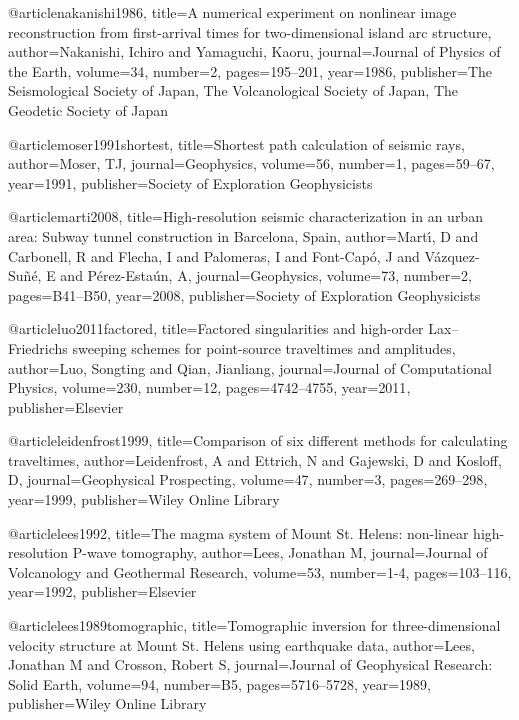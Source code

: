 @article{nakanishi1986,
  title={A numerical experiment on nonlinear image reconstruction from first-arrival times for two-dimensional island arc structure},
  author={Nakanishi, Ichiro and Yamaguchi, Kaoru},
  journal={Journal of Physics of the Earth},
  volume={34},
  number={2},
  pages={195--201},
  year={1986},
  publisher={The Seismological Society of Japan, The Volcanological Society of Japan, The Geodetic Society of Japan}
}

@article{moser1991shortest,
  title={Shortest path calculation of seismic rays},
  author={Moser, TJ},
  journal={Geophysics},
  volume={56},
  number={1},
  pages={59--67},
  year={1991},
  publisher={Society of Exploration Geophysicists}
}



@article{marti2008,
  title={High-resolution seismic characterization in an urban area: Subway tunnel construction in Barcelona, Spain},
  author={Mart{\'\i}, D and Carbonell, R and Flecha, I and Palomeras, I and Font-Cap{\'o}, J and V{\'a}zquez-Su{\~n}{\'e}, E and P{\'e}rez-Esta{\'u}n, A},
  journal={Geophysics},
  volume={73},
  number={2},
  pages={B41--B50},
  year={2008},
  publisher={Society of Exploration Geophysicists}
}

@article{luo2011factored,
  title={Factored singularities and high-order Lax--Friedrichs sweeping schemes for point-source traveltimes and amplitudes},
  author={Luo, Songting and Qian, Jianliang},
  journal={Journal of Computational Physics},
  volume={230},
  number={12},
  pages={4742--4755},
  year={2011},
  publisher={Elsevier}
}



@article{leidenfrost1999,
  title={Comparison of six different methods for calculating traveltimes},
  author={Leidenfrost, A and Ettrich, N and Gajewski, D and Kosloff, D},
  journal={Geophysical Prospecting},
  volume={47},
  number={3},
  pages={269--298},
  year={1999},
  publisher={Wiley Online Library}
}


@article{lees1992,
  title={The magma system of Mount St. Helens: non-linear high-resolution P-wave tomography},
  author={Lees, Jonathan M},
  journal={Journal of Volcanology and Geothermal Research},
  volume={53},
  number={1-4},
  pages={103--116},
  year={1992},
  publisher={Elsevier}
}

@article{lees1989tomographic,
  title={Tomographic inversion for three-dimensional velocity structure at Mount St. Helens using earthquake data},
  author={Lees, Jonathan M and Crosson, Robert S},
  journal={Journal of Geophysical Research: Solid Earth},
  volume={94},
  number={B5},
  pages={5716--5728},
  year={1989},
  publisher={Wiley Online Library}
}

